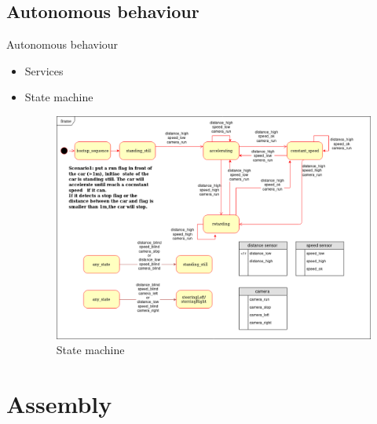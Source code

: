 \documentclass{beamer}
\begin{document}
\subsection{Autonomous behaviour}

\begin{frame}{Autonomous behaviour}
    \begin{itemize}
        \item Services
        \item State machine
            \begin{figure}
                \includegraphics[width=0.7\linewidth]{statemachine.png}
                \caption{State machine}
            \end{figure}
    \end{itemize}

\end{frame}


\section{Assembly}
\end{document}
